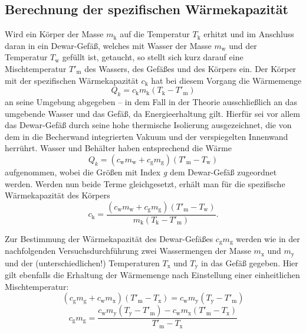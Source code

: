 \subsection{Berechnung der spezifischen Wärmekapazität}
    Wird ein Körper der Masse $m_\text{k}$ auf die Temperatur $T_\text{k}$ erhitzt und im Anschluss daran in ein Dewar-Gefäß, 
    welches mit Wasser der Masse $m_\text{w}$ und der Temperatur $T_\text{w}$ gefüllt ist, getaucht, so stellt sich 
    kurz darauf eine Mischtemperatur $T'_\text{m}$ des Wassers, des Gefäßes und des Körpers ein. 
    Der Körper mit der spezifischen Wärmekapazität $c_\text{k}$ hat bei diesem Vorgang die Wärmemenge 
    \begin{equation}
        Q_k = c_\text{k} m_\text{k} (T_\text{k} - T'_\text{m})
    \end{equation}
    an seine Umgebung abgegeben -- in dem Fall in der Theorie ausschließlich an das umgebende Wasser und das Gefäß, 
    da Energieerhaltung gilt. 
    Hierfür sei vor allem das Dewar-Gefäß durch seine hohe thermische Isolierung ausgezeichnet, die von dem in die 
    Becherwand integrierten Vakuum und der verspiegelten Innenwand herrührt. 
    Wasser und Behälter haben entsprechend die Wärme 
    \begin{equation}
        Q_k = (c_\text{w} m_\text{w} + c_\text{g} m_\text{g}) (T'_\text{m} - T_\text{w})
    \end{equation}
    aufgenommen, wobei die Größen mit Index \textit{g} dem Dewar-Gefäß zugeordnet werden. 
    Werden nun beide Terme gleichgesetzt, erhält man für die spezifische Wärmekapazität des Körpers 
    \begin{equation}
        c_\text{k} = \frac{(c_\text{w} m_\text{w} + c_\text{g}m_\text{g})(T'_\text{m} - T_\text{w})}{m_\text{k}(T_\text{k} - T'_\text{m})}.
        \label{eqn:c_k}
    \end{equation}

    Zur Bestimmung der Wärmekapazität des Dewar-Gefäßes $c_\text{g} m_\text{g}$ werden wie in der nachfolgenden Versuchsdurchführung 
    zwei Wassermengen der Masse $m_\text{x}$ und $m_\text{y}$ und der (unterschiedlichen!) Temperaturen $T_\text{x}$ und 
    $T_\text{y}$ in das Gefäß gegeben. 
    Hier gilt ebenfalls die Erhaltung der Wärmemenge nach Einstellung einer einheitlichen Mischtemperatur: 
    \begin{equation}
        (c_\text{g} m_\text{g} + c_\text{w} m_\text{x})(T'_\text{m} - T_\text{x}) = c_\text{w} m_\text{y} (T_\text{y} - T'_\text{m})
    \end{equation}
    \begin{equation}
        c_\text{g} m_\text{g} = \frac{c_\text{w} m_\text{y} (T_\text{y} - T'_\text{m}) - c_\text{w} m_\text{x} (T'_\text{m} - T_\text{x})}{T'_\text{m} - T_\text{x}}
        \label{eqn:dewar}
    \end{equation}

